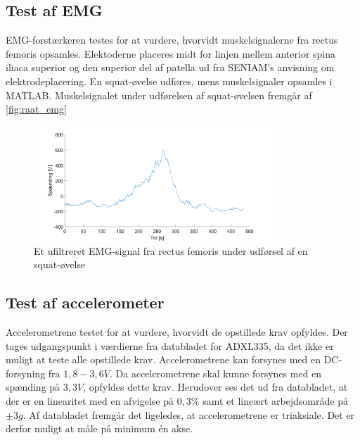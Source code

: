 \subsection{Test af EMG}

EMG-forstærkeren testes for at vurdere, hvorvidt muskelsignalerne fra rectus femoris opsamles. Elektoderne placeres midt for linjen mellem anterior spina iliaca superior og den superior del af patella ud fra SENIAM's anvisning om elektrodeplacering. En squat-øvelse udføres, mens muskelsignaler opsamles i MATLAB. Muskelsignalet under udførelsen af squat-øvelsen fremgår af \autoref{fig:raat_emg} 

\begin{figure}[H]
\centering
\includegraphics[width=0.8\textwidth]{figures/raat_EMG_test}
\caption{Et ufiltreret EMG-signal fra rectus femoris under udførsel af en squat-øvelse}
\label{fig:raat_emg}
\end{figure}

\subsection{Test af accelerometer}

Accelerometrene testet for at vurdere, hvorvidt de opstillede krav opfyldes. Der tages udgangspunkt i værdierne fra databladet for ADXL335, da det ikke er muligt at teste alle opstillede krav. Accelerometrene kan forsynes med en DC-forsyning fra $1,8-3,6 V$. Da accelerometrene skal kunne forsynes med en spænding på $3,3 V$, opfyldes dette krav. Herudover ses det ud fra databladet, at der er en linearitet med en afvigelse på $0,3\%$ samt et lineært arbejdsområde på $ \pm 3 g$. Af databladet fremgår det ligeledes, at accelerometrene er triaksiale. Det er derfor muligt at måle på minimum én akse.  

